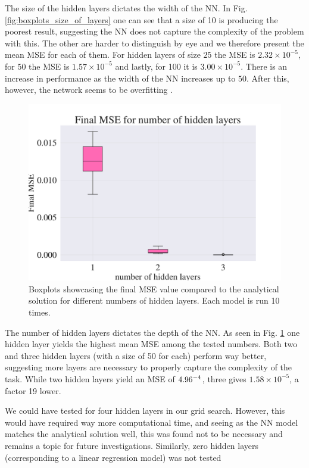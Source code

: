 The size of the hidden layers dictates the width of the NN. 
In Fig. \ref{fig:boxplots_size_of_layers} one can see that a size of 10 is producing the poorest result, suggesting the NN does not capture the complexity of the problem with this. 
The other are harder to distinguish by eye and we therefore present the mean MSE for each of them. 
For hidden layers of size $25$ the MSE is $2.32 \times 10^{-5}$, for $50$ the MSE is $1.57 \times 10^{-5}$ and lastly, for 100 it is $3.00 \times 10^{-5}$.
There is an increase in performance as the width of the NN increases up to $50$. 
After this, however, the network seems to be overfitting . 

\begin{figure}[h!]
    \centering
    \includegraphics[width=1.0\linewidth]{project_3/plots/n_layers_search.pdf}
    \caption{Boxplots showcasing the final MSE value compared to the analytical solution for different numbers of hidden layers. Each model is run 10 times.}
    \label{fig:boxplots_number_of_hidden_layers}
\end{figure}


The number of hidden layers dictates the depth of the NN. 
As seen in Fig. \ref{fig:boxplots_number_of_hidden_layers} one hidden layer yields the highest mean MSE among the tested numbers. 
Both two and three hidden layers (with a size of 50 for each) perform way better, suggesting more layers are necessary to properly capture the complexity of the task. 
While two hidden layers yield an MSE of $4.96 \time 10^{-4}$, three gives $1.58 \times 10^{-5}$, a factor 19 lower. 


We could have tested for four hidden layers in our grid search. 
However, this would have required way more computational time, and seeing as the NN model matches the analytical solution well, this was found not to be necessary and remains a topic for future investigations. 
Similarly, zero hidden layers (corresponding to a linear regression model) was not tested 